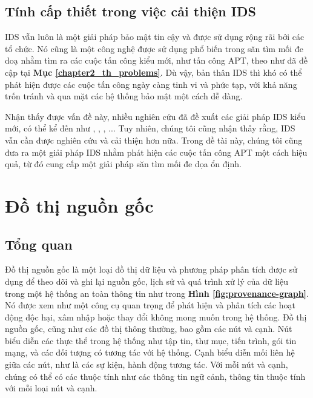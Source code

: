 \subsection{Tính cấp thiết trong việc cải thiện IDS}

IDS vẫn luôn là một giải pháp bảo mật tin cậy và được sử dụng rộng rãi bởi các tổ chức. Nó cũng là một công nghệ được sử dụng phổ biến trong săn tìm mối đe doạ nhằm tìm ra các cuộc tấn công kiểu mới, như tấn công APT, theo như đã đề cập tại \textbf{Mục \ref{chapter2_th_problems}}. Dù vậy, bản thân IDS thì khó có thể phát hiện được các cuộc tấn công ngày càng tinh vi và phức tạp, với khả năng trốn tránh và qua mặt các hệ thống bảo mật một cách dễ dàng.

\bigbreak\noindent
Nhận thấy được vấn đề này, nhiều nghiên cứu đã đề xuất các giải pháp IDS kiểu mới, có thể kể đến như \cite{yazdinejadna2021kangaroo}, \cite{chen2022building}, \cite{lo2022graphsage}, ... Tuy nhiên, chúng tôi cũng nhận thấy rằng, IDS vẫn cần được nghiên cứu và cải thiện hơn nữa. Trong đề tài này, chúng tôi cũng đưa ra một giải pháp IDS nhằm phát hiện các cuộc tấn công APT một cách hiệu quả, từ đó cung cấp một giải pháp săn tìm mối đe dọa ổn định.


\section{Đồ thị nguồn gốc}\label{Chapter2_PG}

\subsection{Tổng quan}

Đồ thị nguồn gốc là một loại đồ thị dữ liệu và phương pháp phân tích được sử dụng để theo dõi và ghi lại nguồn gốc, lịch sử và quá trình xử lý của dữ liệu trong một hệ thống an toàn thông tin như trong \textbf{Hình \ref{fig:provenance-graph}}. Nó được xem như một công cụ quan trọng để phát hiện và phân tích các hoạt động độc hại, xâm nhập hoặc thay đổi không mong muốn trong hệ thống. Đồ thị nguồn gốc, cũng như các đồ thị thông thường, bao gồm các nút và cạnh. Nút biểu diễn các thực thể trong hệ thống như tập tin, thư mục, tiến trình, gói tin mạng, và các đối tượng có tương tác với hệ thống. Cạnh biểu diễn mối liên hệ giữa các nút, như là các sự kiện, hành động tương tác. Với mỗi nút và cạnh, chúng có thể có các thuộc tính như các thông tin ngữ cảnh, thông tin thuộc tính với mỗi loại nút và cạnh.

